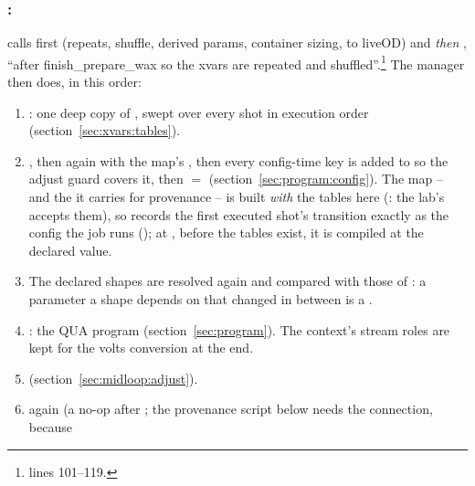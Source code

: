 \subsubsection{: }

 calls  first (repeats,
shuffle, derived params, container sizing,  to liveOD) and
\emph{then} , ``after finish\_prepare\_wax
so the xvars are repeated and shuffled''.\footnote{
lines 101--119.} The manager then does, in this order:

\begin{enumerate}[nosep]
  \item {}: one deep copy of
    , swept over every shot in execution order
    (section~\ref{sec:xvars:tables}).
  \item {}, then
     again with the map's
    , then every config-time key is added to
     so the adjust guard covers it, then
     $=$
    (section~\ref{sec:program:config}). The map -- and the  it
    carries for provenance -- is built \emph{with} the tables here
    (: the lab's
     accepts them), so  records
    the first executed shot's transition exactly as the config the job runs
    (); at
    , before the tables exist, it is compiled at the declared
    value.
  \item The declared shapes are resolved again and compared with those of
    : a parameter a shape depends on that changed in between is
    a .
  \item {}: the
    QUA program (section~\ref{sec:program}). The context's stream roles are
    kept for the volts conversion at the end.
  \item {}
    (section~\ref{sec:midloop:adjust}).
  \item {} again (a no-op after ; the provenance
    script below needs the connection, because 

\end{enumerate}
